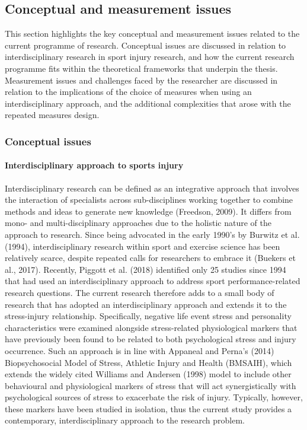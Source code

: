 \documentclass[man,floatsintext]{apa6}
\let\oldparagraph\paragraph
\renewcommand{\paragraph}[1]{\oldparagraph{#1}\mbox{}}
\begin{document}
\hypertarget{conceptual-and-measurement-issues}{%
\subsection{Conceptual and measurement issues}\label{conceptual-and-measurement-issues}}

This section highlights the key conceptual and measurement issues related to the current programme of research.
Conceptual issues are discussed in relation to interdisciplinary research in sport injury research, and how the current research programme fits within the theoretical frameworks that underpin the thesis.
Measurement issues and challenges faced by the researcher are discussed in relation to the implications of the choice of measures when using an interdisciplinary approach, and the additional complexities that arose with the repeated measures design.

\hypertarget{conceptual-issues}{%
\subsubsection{Conceptual issues}\label{conceptual-issues}}

\hypertarget{interdisciplinary-approach-to-sports-injury}{%
\paragraph{Interdisciplinary approach to sports injury}\label{interdisciplinary-approach-to-sports-injury}}

Interdisciplinary research can be defined as an integrative approach that involves the interaction of specialists across sub-disciplines working together to combine methods and ideas to generate new knowledge (Freedson, 2009).
It differs from mono- and multi-disciplinary approaches due to the holistic nature of the approach to research.
Since being advocated in the early 1990's by Burwitz et al. (1994), interdisciplinary research within sport and exercise science has been relatively scarce, despite repeated calls for researchers to embrace it (Buekers et al., 2017).
Recently, Piggott et al. (2018) identified only 25 studies since 1994 that had used an interdisciplinary approach to address sport performance-related research questions.
The current research therefore adds to a small body of research that has adopted an interdisciplinary approach and extends it to the stress-injury relationship.
Specifically, negative life event stress and personality characteristics were examined alongside stress-related physiological markers that have previously been found to be related to both psychological stress and injury occurrence.
Such an approach is in line with Appaneal and Perna's (2014) Biopsychosocial Model of Stress, Athletic Injury and Health (BMSAIH), which extends the widely cited Williams and Andersen (1998) model to include other behavioural and physiological markers of stress that will act synergistically with psychological sources of stress to exacerbate the risk of injury.
Typically, however, these markers have been studied in isolation, thus the current study provides a contemporary, interdisciplinary approach to the research problem.
\end{document}
